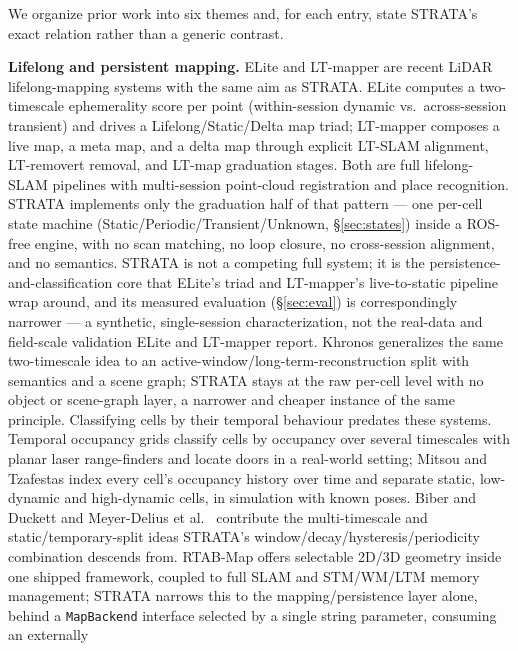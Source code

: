 \documentclass[conference]{IEEEtran}
\begin{document}
We organize prior work into six themes and, for each entry, state STRATA's
exact relation rather than a generic contrast.

\textbf{Lifelong and persistent mapping.} ELite \cite{gil2025elite} and LT-mapper
\cite{kim2022ltmapper} are recent LiDAR lifelong-mapping systems with the same
aim as STRATA. ELite computes a
two-timescale ephemerality score per point (within-session dynamic vs.\
across-session transient) and drives a Lifelong/Static/Delta map triad;
LT-mapper composes a live map, a meta map, and a delta map through explicit
LT-SLAM alignment, LT-removert removal, and LT-map graduation stages. Both
are full lifelong-SLAM pipelines with multi-session point-cloud registration
and place recognition. STRATA implements only the graduation half of that
pattern --- one per-cell state machine (Static/Periodic/Transient/Unknown,
\S\ref{sec:states}) inside a ROS-free engine, with no scan matching, no loop closure,
no cross-session alignment, and no semantics. STRATA is not a competing full
system; it is the persistence-and-classification core that ELite's triad and
LT-mapper's live-to-static pipeline wrap around, and its measured evaluation
(\S\ref{sec:eval}) is correspondingly narrower --- a synthetic, single-session
characterization, not the real-data and field-scale validation ELite and
LT-mapper report. Khronos
\cite{schmid2024khronos} generalizes the same two-timescale idea to an
active-window/long-term-reconstruction split with semantics and a scene
graph; STRATA stays at the raw per-cell level with no object or scene-graph
layer, a narrower and cheaper instance of the same principle. Classifying
cells by their temporal behaviour predates these systems. Temporal occupancy
grids \cite{arbuckle2002temporal} classify cells by occupancy over several
timescales with planar laser range-finders and locate doors in a real-world
setting; Mitsou and Tzafestas \cite{mitsou2007temporal} index every cell's
occupancy history over time and separate static, low-dynamic and high-dynamic
cells, in simulation with known poses. Biber and Duckett
\cite{biber2005dynamicmaps} and Meyer-Delius et al.\
\cite{meyerdelius2010temporary} contribute the multi-timescale and
static/temporary-split ideas STRATA's window/decay/hysteresis/periodicity
combination descends from. RTAB-Map \cite{labbe2019rtabmap} offers selectable
2D/3D geometry inside one shipped framework, coupled to full SLAM and STM/WM/LTM memory management; STRATA
narrows this to the mapping/persistence layer alone, behind a \texttt{MapBackend}
interface selected by a single string parameter, consuming an externally
\end{document}
